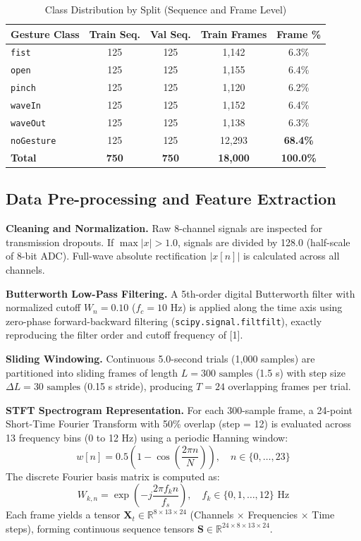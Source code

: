 \documentclass[conference]{IEEEtran}
\begin{document}
\begin{table}[h]
\centering
\caption{Class Distribution by Split (Sequence and Frame Level)}
\label{tab:distribution}
\begin{tabular}{lcccc}
\toprule
\textbf{Gesture Class} & \textbf{Train Seq.} & \textbf{Val Seq.} & \textbf{Train Frames} & \textbf{Frame \%} \\
\midrule
\texttt{fist}      & 125 & 125 & 1,142  & 6.3\% \\
\texttt{open}      & 125 & 125 & 1,155  & 6.4\% \\
\texttt{pinch}     & 125 & 125 & 1,120  & 6.2\% \\
\texttt{waveIn}    & 125 & 125 & 1,152  & 6.4\% \\
\texttt{waveOut}   & 125 & 125 & 1,138  & 6.3\% \\
\texttt{noGesture} & 125 & 125 & 12,293 & \textbf{68.4\%} \\
\midrule
\textbf{Total}     & \textbf{750} & \textbf{750} & \textbf{18,000} & \textbf{100.0\%} \\
\bottomrule
\end{tabular}
\end{table}

\subsection{Data Pre-processing and Feature Extraction}
\textbf{Cleaning and Normalization.} Raw 8-channel signals are inspected for transmission dropouts. If $\max |x| > 1.0$, signals are divided by 128.0 (half-scale of 8-bit ADC). Full-wave absolute rectification $|x[n]|$ is calculated across all channels.

\textbf{Butterworth Low-Pass Filtering.} A 5th-order digital Butterworth filter with normalized cutoff $W_n = 0.10$ ($f_c = 10\text{ Hz}$) is applied along the time axis using zero-phase forward-backward filtering (\texttt{scipy.signal.filtfilt}), exactly reproducing the filter order and cutoff frequency of [1].

\textbf{Sliding Windowing.} Continuous 5.0-second trials (1,000 samples) are partitioned into sliding frames of length $L = 300\text{ samples}$ (1.5 s) with step size $\Delta L = 30\text{ samples}$ (0.15 s stride), producing $T = 24$ overlapping frames per trial.

\textbf{STFT Spectrogram Representation.} For each 300-sample frame, a 24-point Short-Time Fourier Transform with 50\% overlap (step = 12) is evaluated across 13 frequency bins (0 to 12 Hz) using a periodic Hanning window:
\begin{equation}
w[n] = 0.5 \left(1 - \cos\left(\frac{2\pi n}{N}\right)\right), \quad n \in \{0, \dots, 23\}
\end{equation}
The discrete Fourier basis matrix is computed as:
\begin{equation}
W_{k,n} = \exp\left(-j \frac{2\pi f_k n}{f_s}\right), \quad f_k \in \{0, 1, \dots, 12\}\text{ Hz}
\end{equation}
Each frame yields a tensor $\mathbf{X}_t \in \mathbb{R}^{8 \times 13 \times 24}$ (Channels $\times$ Frequencies $\times$ Time steps), forming continuous sequence tensors $\mathbf{S} \in \mathbb{R}^{24 \times 8 \times 13 \times 24}$.
\end{document}
